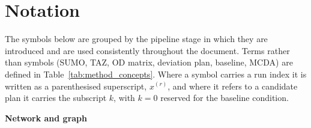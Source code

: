 \section*{Notation}
\label{sec:notation}

The symbols below are grouped by the pipeline stage in which they are
introduced and are used consistently throughout the document. Terms rather than
symbols (SUMO, TAZ, OD matrix, deviation plan, baseline, MCDA) are defined in
Table~\ref{tab:method_concepts}. Where a symbol carries a run index it is
written as a parenthesised superscript, $x^{(r)}$, and where it refers to a
candidate plan it carries the subscript $k$, with $k=0$ reserved for the
baseline condition.

\vspace{0.6em}
\noindent\textbf{Network and graph}
\nopagebreak

